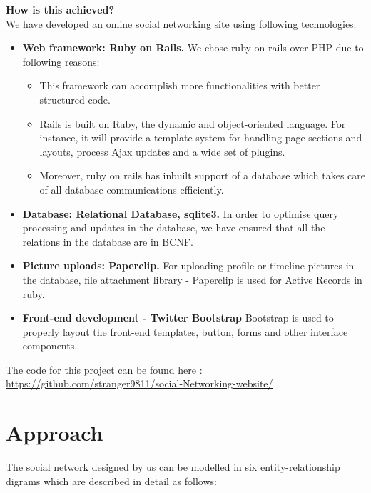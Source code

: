 \documentclass{article}
\begin{document}
\textbf{How is this achieved?}\\
We have developed an online social networking site using following technologies:
\begin{itemize}
\item \textbf{Web framework: Ruby on Rails\cite{rubyonrails}.} We chose ruby on rails over PHP due to following reasons:
\begin{itemize}
\item This framework can accomplish more functionalities with better structured code.
\item Rails is built on Ruby, the dynamic and object-oriented language. For instance, it will provide a template system for handling page sections and layouts, process Ajax updates and a wide set of plugins.
\item Moreover, ruby on rails has inbuilt support of a database which takes care of all database communications efficiently.
\end{itemize}
\item \textbf{Database: Relational Database, sqlite3.} In order to optimise query processing and updates in the database, we have ensured that all the relations in the database are in BCNF.
\item \textbf{Picture uploads: Paperclip\cite{paperclip}.} For uploading profile or timeline pictures in the database, file attachment library - Paperclip  is used for Active Records in ruby. 
\item \textbf{Front-end development - Twitter Bootstrap\cite{bootstrap}} Bootstrap is used to properly layout the front-end templates, button, forms and other interface components.
\end{itemize}  

The code for this project can be found here :\\ \url{https://github.com/stranger9811/social-Networking-website/}

\section{Approach}
The social network designed by us can be modelled in six entity-relationship digrams which are described in detail as follows:
\end{document}
